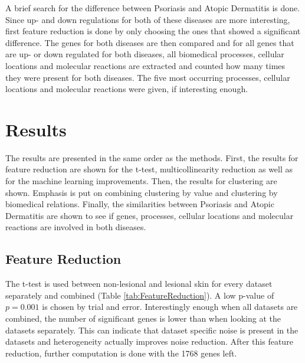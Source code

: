 \documentclass[10pt,a4paper]{article}
\begin{document}
	A brief search for the difference between Psoriasis and Atopic Dermatitis is done. Since up- and down regulations for both of these diseases are more interesting, first feature reduction is done by only choosing the ones that showed a significant difference. The genes for both diseases are then compared and for all genes that are up- or down regulated for both diseases, all biomedical processes, cellular locations and molecular reactions are extracted and counted how many times they were present for both diseases. The five most occurring processes, cellular locations and molecular reactions were given, if interesting enough.
	
	\section{Results}
	\label{sec:Results}
	
	The results are presented in the same order as the methods. First, the results for feature reduction are shown for the t-test, multicollinearity reduction as well as for the machine learning improvements. Then, the results for clustering are shown. Emphasis is put on combining clustering by value and clustering by biomedical relations. Finally, the similarities between Psoriasis and Atopic Dermatitis are shown to see if genes, processes, cellular locations and molecular reactions are involved in both diseases. 
	
	
	\subsection{Feature Reduction}
	\label{subsec:ResultsFeatureResuction}
	
	The t-test is used between non-lesional and lesional skin for every dataset separately and combined (Table \ref{tab:FeatureReduction}). A low p-value of $p=0.001$ is chosen by trial and error. Interestingly enough when all datasets are combined, the number of significant genes is lower than when looking at the datasets separately. This can indicate that dataset specific noise is present in the datasets and heterogeneity actually improves noise reduction. After this feature reduction, further computation is done with the 1768 genes left.
	
\end{document}
